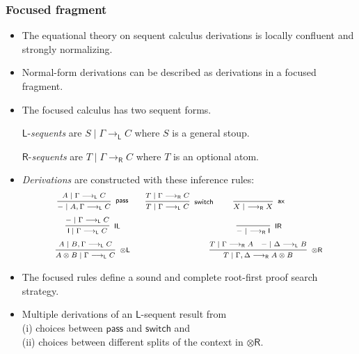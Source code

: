 \documentclass[10pt,t]{beamer}
\newcommand{\I}{\mathsf{I}}
\newcommand{\ot}{\otimes}
\newcommand{\n}{{-}}
\newcommand{\ax}{\mathsf{ax}}
\newcommand{\uf}{\mathsf{pass}}
\newcommand{\IL}{\I\mathsf{L}}
\newcommand{\otL}{\ot\mathsf{L}}
\newcommand{\IR}{\I\mathsf{R}}
\newcommand{\otR}{\ot\mathsf{R}}
\renewcommand{\vdash}{\longrightarrow}
\newcommand{\vdashL}{\vdash_\mathsf{L}}
\newcommand{\vdashR}{\vdash_\mathsf{R}}
\newcommand{\msw}{\mathsf{switch}}
\begin{document}
\begin{frame}

\frametitle{Focused fragment}

\begin{itemize}

\item The equational theory on sequent calculus derivations is locally
  confluent and strongly normalizing.

\item Normal-form derivations can be described as derivations in a
  focused fragment.

\item The focused calculus has two sequent forms. 

  $\mathsf{L}$-\emph{sequents} are $S \mid \Gamma \vdashL C$ where $S$
  is a general stoup.

  $\mathsf{R}$-\emph{sequents} are $T \mid \Gamma \vdashR C$ where $T$
  is an optional atom.

\item \emph{Derivations} are constructed with these inference rules:
\[
\scriptsize
\begin{array}{c@{\quad \quad}c@{\quad \quad}c}
\infer[\uf]{\n \mid A, \Gamma \vdashL C}{
  A \mid \Gamma \vdashL C
}
&
\infer[\msw]{T \mid \Gamma \vdashL C}{
  T \mid \Gamma \vdashR C
}
\hspace*{-12mm}
&
\infer[\ax]{X \mid ~\vdashR X}{
}
\\[6pt]
\infer[\IL]{\I \mid \Gamma \vdashL C}{
  \n \mid \Gamma \vdashL C
}
& &
\infer[\IR]{\n \mid ~ \vdashR \I}{
}
\\[6pt]
\infer[\otL]{A \ot B \mid \Gamma \vdashL C}{
  A \mid B, \Gamma \vdashL C
}
& &
\hspace*{5mm}
\infer[\otR]{T \mid \Gamma, \Delta \vdashR A \otimes B}{
  T \mid \Gamma \vdashR A
  &
  \n \mid \Delta \vdashL B
} 
\end{array}
\]

\item The focused rules define a sound and complete root-first proof
  search strategy.

\item Multiple derivations of an $\mathsf{L}$-sequent result from \\
  (i) choices between $\uf$ and $\msw$ and \\ (ii) choices between
  different splits of the context in $\otR$.

\end{itemize}

\end{frame}
\end{document}
